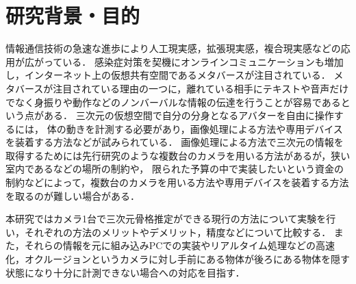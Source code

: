 \documentclass[titlepage]{jarticle}
\begin{document}
\maketitle

%
%
\section{研究背景・目的}
%
情報通信技術の急速な進歩により人工現実感，拡張現実感，複合現実感などの応用が広がっている．
感染症対策を契機にオンラインコミュニケーションも増加し，インターネット上の仮想共有空間であるメタバースが注目されている．
メタバースが注目されている理由の一つに，離れている相手にテキストや音声だけでなく身振りや動作などのノンバーバルな情報の伝達を行うことが容易であるという点がある．
三次元の仮想空間で自分の分身となるアバターを自由に操作するには，
体の動きを計測する必要があり，画像処理による方法\cite{CV}や専用デバイスを装着する方法\cite{キャプチャ}などが試みられている．
画像処理による方法で三次元の情報を取得するためには先行研究のような複数台のカメラを用いる方法\cite{turugi}があるが，狭い室内であるなどの場所の制約や，
限られた予算の中で実装したいという資金の制約などによって，複数台のカメラを用いる方法や専用デバイスを装着する方法を取るのが難しい場合がある．

本研究ではカメラ1台で三次元骨格推定ができる現行の方法について実験を行い，それぞれの方法のメリットやデメリット，精度などについて比較する．
また，それらの情報を元に組み込みPCでの実装やリアルタイム処理などの高速化，オクルージョンというカメラに対し手前にある物体が後ろにある物体を隠す状態になり十分に計測できない場合への対応を目指す．

\end{document}
